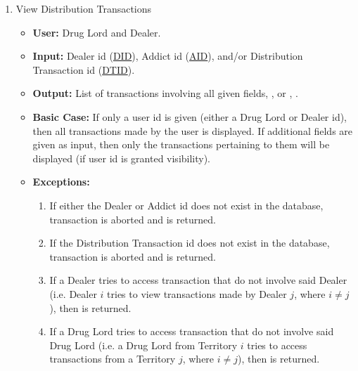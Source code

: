 \documentclass[11pt, oneside]{article}   	%
\theoremstyle{definition}
\theoremstyle{remark}
\begin{document}
\begin{enumerate}
		
	\item View Distribution Transactions
	\begin{itemize}
			\item \textbf{User:} Drug Lord and Dealer.
			\item \textbf{Input:} Dealer id (\underline{DID}), Addict id (\underline{AID}), and/or Distribution Transaction id (\underline{DTID}).
			\item \textbf{Output:} List of transactions involving all given fields, , or , .
			\item \textbf{Basic Case:} If only a user id is given (either a Drug Lord or Dealer id), then all transactions made by the user is displayed. If additional fields are given as input, then only the transactions pertaining to them will be displayed (if user id is granted visibility).
			\item \textbf{Exceptions:}
			\begin{enumerate}
				\item If either the Dealer or Addict id does not exist in the database, transaction is aborted and  is returned.
				\item If the Distribution Transaction id does not exist in the database, transaction is aborted and  is returned.
				\item If a Dealer tries to access transaction that do not involve said Dealer (i.e. Dealer $i$ tries to view transactions made by Dealer $j$, where $i\neq j$), then  is returned.	
				\item If a Drug Lord tries to access transaction that do not involve said Drug Lord (i.e. a Drug Lord from Territory $i$ tries to access transactions from a Territory $j$, where $i\neq j$), then  is returned.	
			\end{enumerate}
		\end{itemize}	
	

\end{enumerate}
\end{document}
